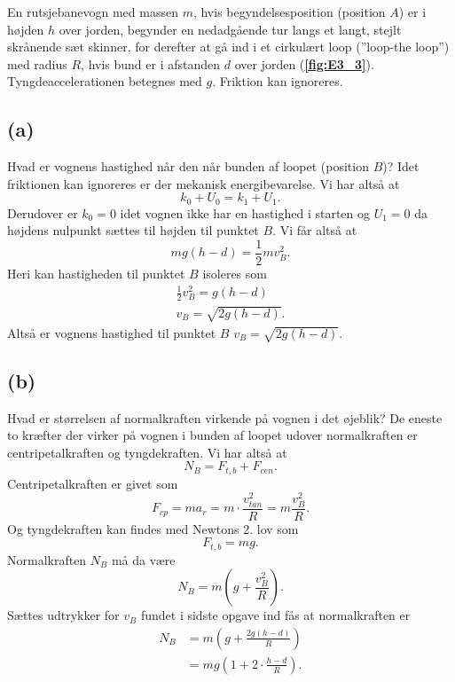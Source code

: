 \documentclass[12pt]{article}
\theoremstyle{definition}
\begin{document}
En rutsjebanevogn med massen $m$, hvis begyndelsesposition (position $A$) er i højden $h$ over jorden, begynder en nedadgående tur langs et langt, stejlt skrånende sæt skinner, for derefter at gå ind i et cirkulært loop (”loop-the loop”) med radius $R$, hvis bund er i afstanden $d$ over jorden (\textbf{\autoref{fig:E3_3}}). Tyngdeaccelerationen betegnes med $g$. Friktion kan ignoreres.

\subsection*{(a)}
Hvad er vognens hastighed når den når bunden af loopet (position $B$)?
\bigbreak
Idet friktionen kan ignoreres er der mekanisk energibevarelse. Vi har altså at
\[ 
k_{0} + U_{0} = k_{1} + U_{1}
.\]
Derudover er $k_0 = 0$ idet vognen ikke har en hastighed i starten og $U_1 = 0$ da højdens nulpunkt sættes til højden til punktet $B$. Vi får altså at
\[ 
mg(h-d) = \frac{1}{2}mv_B^2 
.\]
Heri kan hastigheden til punktet $B$ isoleres som
\begin{align*}
  \frac{1}{2}v_B^2 = g(h-d) \\
  v_B = \sqrt{2g(h-d)}
.\end{align*}
Altså er vognens hastighed til punktet $B$ \underline{\underline{$v_B = \sqrt{2g(h-d)}$}}.

\subsection*{(b)}
Hvad er størrelsen af normalkraften virkende på vognen i det øjeblik?
\bigbreak
De eneste to kræfter der virker på vognen i bunden af loopet udover normalkraften er centripetalkraften og tyngdekraften. Vi har altså at
\[ 
N_B = F_{t,b} + F_{cen}
.\]
Centripetalkraften er givet som
\[ 
F_{cp} = m a_r = m \cdot \frac{v^2_{tan}}{R} = m\frac{v_B^2}{R}
.\]
Og tyngdekraften kan findes med Newtons 2. lov som
\[ 
F_{t,b} = mg
.\]
Normalkraften $N_B$ må da være
\[ 
N_B = m \left( g + \frac{v_B^2}{R} \right)
.\]
Sættes udtrykker for $v_B$ fundet i sidste opgave ind fås at normalkraften er
\begin{align*}
  N_B &= m \left( g + \frac{2g(h-d)}{R} \right) \\
  &= mg \left( 1 + 2 \cdot \frac{h-d}{R} \right)
.\end{align*}
\end{document}
